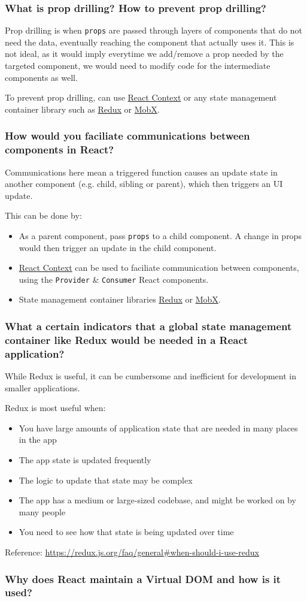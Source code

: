 \documentclass[12pt, a4paper]{article}
\newcommand{\code}[1]{\texttt{#1}}
\begin{document}
\subsubsection*{What is prop drilling? How to prevent prop drilling?}
Prop drilling is when \code{props} are passed through layers of components that do not need the data, eventually reaching the component that actually uses it.
This is not ideal, as it would imply everytime we add/remove a prop needed by the targeted component, we would need to modify code for the intermediate components as well.

To prevent prop drilling, can use \href{https://reactjs.org/docs/context.html}{React Context} or any state management container library such as \href{https://redux.js.org/introduction/getting-started}{Redux} or \href{https://mobx.js.org/README.html}{MobX}.

\subsubsection*{How would you faciliate communications between components in React?}
Communications here mean a triggered function causes an update state in another component (e.g. child, sibling or parent), which then triggers an UI update.

This can be done by:
\begin{itemize}
  \item As a parent component, pass \code{props} to a child component.
        A change in props would then trigger an update in the child component.
  \item \href{https://reactjs.org/docs/context.html}{React Context} can be used to faciliate communication between components, using the \code{Provider} \& \code{Consumer} React components.
  \item State management container libraries \href{https://redux.js.org/introduction/getting-started}{Redux} or \href{https://mobx.js.org/README.html}{MobX}.
\end{itemize}

\subsubsection*{What a certain indicators that a global state management container like Redux would be needed in a React application?}
While Redux is useful, it can be cumbersome and inefficient for development in smaller applications.

Redux is most useful when:
\begin{itemize}
  \item You have large amounts of application state that are needed in many places in the app
  \item The app state is updated frequently
  \item The logic to update that state may be complex
  \item The app has a medium or large-sized codebase, and might be worked on by many people
  \item You need to see how that state is being updated over time
\end{itemize}

Reference: \url{https://redux.js.org/faq/general#when-should-i-use-redux}

\subsubsection*{Why does React maintain a Virtual DOM and how is it used?}
\end{document}
